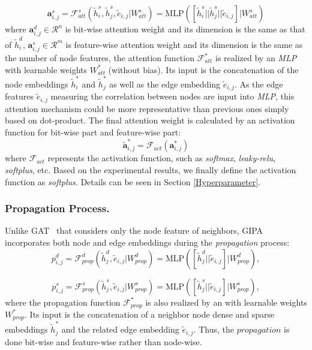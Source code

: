\documentclass[runningheads]{llncs}
\newcommand{\model}{GIPA\xspace}
\begin{document}
\begin{equation}
\label{eq:att2}
\bm{a}_{i, j}^s = \mathcal{F}_{att}^s(\tilde{h}_i^s, \tilde{h}_j^s, \tilde{e}_{i, j}|W_{att}^s) = \text{MLP}([\tilde{h}_i^s || \tilde{h}_j^s || \tilde{e}_{i, j}]|W_{att}^s)
\end{equation}
\noindent where $\bm{a}_{i, j}^d \in \mathcal{R}^n$ is bit-wise attention weight and its dimension is the same as that of $\tilde{h}_i^d$, $\bm{a}_{i, j}^s \in \mathcal{R}^m$ is feature-wise attention weight and its dimension is the same as the number of node features, the attention function $\mathcal{F}_{att}^*$ is realized by an \textit{MLP} with learnable weights $W_{att}^*$ (without bias). Its input is the concatenation of the node embeddings $\tilde{h}_i^*$ and $\tilde{h}_j^*$ as well as the edge embedding $\tilde{e}_{i, j}$. As the edge features $\tilde{e}_{i, j}$ measuring the correlation between nodes are input into \textit{MLP}, this attention mechanism could be more representative than previous ones simply based on dot-product. The final attention weight is calculated by an  activation function for bit-wise part and feature-wise part:
\begin{equation}
\label{eq:softmax1}
\tilde{\bm{a}}_{i, j}^* = \mathcal{F}_{act}(\bm{a}_{i, j}^*) 
\end{equation}
\noindent where $ \mathcal{F}_{act}$ represents the activation function, such as \textit{softmax}, \textit{leaky-relu}, \textit{softplus},  etc. Based on the experimental results, we finally define the activation function as \textit{softplus}.  Details can be seen in Section \ref{Hyperparameter}.

\subsubsection{Propagation Process.}
Unlike GAT~\cite{velivckovic2017graph} that considers only the node feature of neighbors, \model incorporates both node and edge embeddings during the \textit{propagation} process:
\begin{equation}
\label{eq:prop1}
p_{i, j}^d = \mathcal{F}_{prop}^d(\tilde{h}_j^d, \tilde{e}_{i,j}|W_{prop}^d) = \text{MLP}([\tilde{h}_j^d || \tilde{e}_{i, j}]|W_{prop}^d), 
\end{equation}

\begin{equation}
\label{eq:prop1}
p_{i, j}^s = \mathcal{F}_{prop}^s(\tilde{h}_j^s, \tilde{e}_{i,j}|W_{prop}^s) = \text{MLP}([\tilde{h}_j^s || \tilde{e}_{i, j}]|W_{prop}^s), 
\end{equation}
\noindent where the propagation function $\mathcal{F}_{prop}^*$ is also realized by an  with learnable weights $W_{prop}^*$. Its input is the concatenation of a neighbor node dense and sparse embeddings $\tilde{h}_j^*$ and the related edge embedding $\tilde{e}_{i, j}$. Thus, the $propagation$ is done bit-wise and feature-wise rather than node-wise. 
\end{document}
